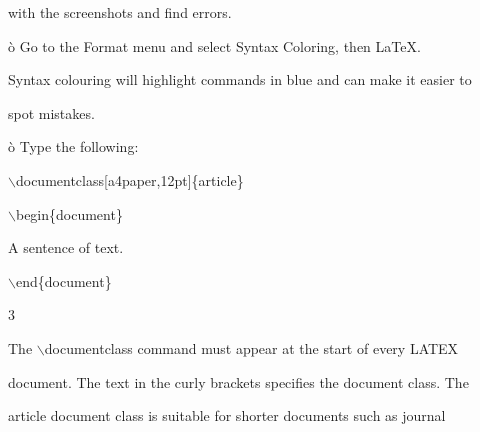 \documentclass[a4paper,portrait,12pt]{article}
\begin{document}
\begin{flushleft}
with the screenshots and find errors.
\end{flushleft}


\begin{flushleft}
\`{o} Go to the Format menu and select Syntax Coloring, then LaTeX.
\end{flushleft}


\begin{flushleft}
Syntax colouring will highlight commands in blue and can make it easier to
\end{flushleft}


\begin{flushleft}
spot mistakes.
\end{flushleft}


\begin{flushleft}
\`{o} Type the following:
\end{flushleft}


\begin{flushleft}
\ensuremath{\backslash}documentclass[a4paper,12pt]\{article\}
\end{flushleft}


\begin{flushleft}
\ensuremath{\backslash}begin\{document\}
\end{flushleft}


\begin{flushleft}
A sentence of text.
\end{flushleft}


\begin{flushleft}
\ensuremath{\backslash}end\{document\}
\end{flushleft}


3





\begin{flushleft}
\newpage
The \ensuremath{\backslash}documentclass command must appear at the start of every LATEX
\end{flushleft}


\begin{flushleft}
document. The text in the curly brackets specifies the document class. The
\end{flushleft}


\begin{flushleft}
article document class is suitable for shorter documents such as journal
\end{flushleft}
\end{document}
